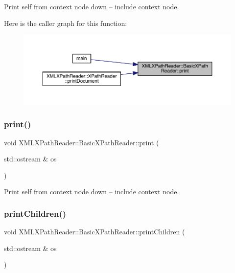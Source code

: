 Print self from context node down -- include context node. 

Here is the caller graph for this function\+:
\nopagebreak
\begin{figure}[H]
\begin{center}
\leavevmode
\includegraphics[width=350pt]{d6/dbf/classXMLXPathReader_1_1BasicXPathReader_a846e0ac9b2835040cb615a9585e2a999_icgraph}
\end{center}
\end{figure}
\mbox{\label{classXMLXPathReader_1_1BasicXPathReader_a846e0ac9b2835040cb615a9585e2a999}} 
\subsubsection{\texorpdfstring{print()}{print()}\hspace{0.1cm}{\footnotesize\ttfamily [2/2]}}
{\footnotesize\ttfamily void X\+M\+L\+X\+Path\+Reader\+::\+Basic\+X\+Path\+Reader\+::print (\begin{DoxyParamCaption}\item[{std\+::ostream \&}]{os }\end{DoxyParamCaption})}



Print self from context node down -- include context node. 

\mbox{\label{classXMLXPathReader_1_1BasicXPathReader_a980f4e08d97855479d47e5b10205075e}} 
\subsubsection{\texorpdfstring{printChildren()}{printChildren()}\hspace{0.1cm}{\footnotesize\ttfamily [1/2]}}
{\footnotesize\ttfamily void X\+M\+L\+X\+Path\+Reader\+::\+Basic\+X\+Path\+Reader\+::print\+Children (\begin{DoxyParamCaption}\item[{std\+::ostream \&}]{os }\end{DoxyParamCaption})}



